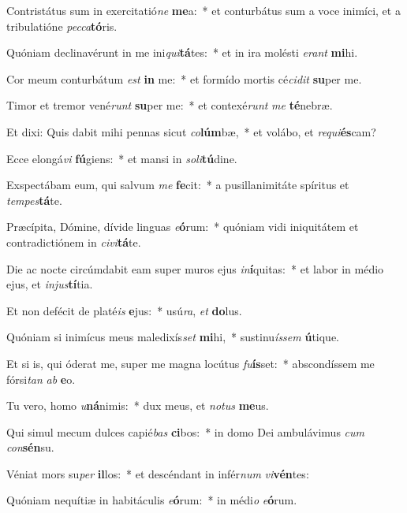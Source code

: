 \item Contristátus sum in exercitatió\textit{ne} \textbf{me}a:~* et conturbátus sum a voce inimíci, et a tribulatióne \textit{pec}\textit{ca}\textbf{tó}ris.
\item Quóniam declinavérunt in me ini\textit{qui}\textbf{tá}tes:~* et in ira molésti \textit{e}\textit{rant} \textbf{mi}hi.
\item Cor meum conturbátum \textit{est} \textbf{in} me:~* et formído mortis cé\textit{ci}\textit{dit} \textbf{su}per me.
\item Timor et tremor vené\textit{runt} \textbf{su}per me:~* et contexé\textit{runt} \textit{me} \textbf{té}nebræ.
\item Et dixi: Quis dabit mihi pennas sicut \textit{co}\textbf{lúm}bæ,~* et volábo, et \textit{re}\textit{qui}\textbf{és}cam?
\item Ecce elongá\textit{vi} \textbf{fú}giens:~* et mansi in \textit{so}\textit{li}\textbf{tú}dine.
\item Exspectábam eum, qui salvum \textit{me} \textbf{fe}cit:~* a pusillanimitáte spíritus et \textit{tem}\textit{pes}\textbf{tá}te.
\item Præcípita, Dómine, dívide linguas \textit{e}\textbf{ó}rum:~* quóniam vidi iniquitátem et contradictiónem in \textit{ci}\textit{vi}\textbf{tá}te.
\item Die ac nocte circúmdabit eam super muros ejus \textit{in}\textbf{í}quitas:~* et labor in médio ejus, et \textit{in}\textit{jus}\textbf{tí}tia.
\item Et non defécit de platé\textit{is} \textbf{e}jus:~* usú\textit{ra}, \textit{et} \textbf{do}lus.
\item Quóniam si inimícus meus maledixís\textit{set} \textbf{mi}hi,~* sustinu\textit{ís}\textit{sem} \textbf{ú}tique.
\item Et si is, qui óderat me, super me magna locútus \textit{fu}\textbf{ís}set:~* abscondíssem me fórsi\textit{tan} \textit{ab} \textbf{e}o.
\item Tu vero, homo \textit{u}\textbf{ná}nimis:~* dux meus, et \textit{no}\textit{tus} \textbf{me}us.
\item Qui simul mecum dulces capié\textit{bas} \textbf{ci}bos:~* in domo Dei ambulávimus \textit{cum} \textit{con}\textbf{sén}su.
\item Véniat mors su\textit{per} \textbf{il}los:~* et descéndant in infér\textit{num} \textit{vi}\textbf{vén}tes:
\item Quóniam nequítiæ in habitáculis \textit{e}\textbf{ó}rum:~* in médi\textit{o} \textit{e}\textbf{ó}rum.
